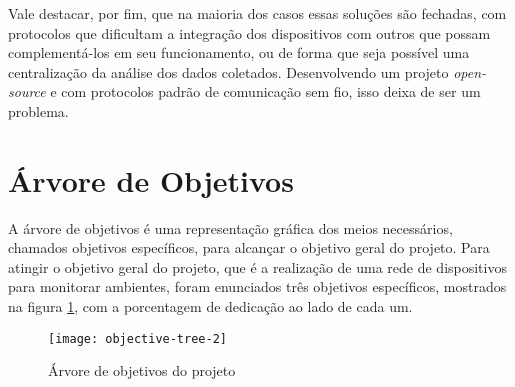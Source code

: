 \documentclass[../monografia.tex]{subfiles}
\begin{document}
Vale destacar, por fim, que na maioria dos casos essas soluções são fechadas, com protocolos que dificultam a integração dos dispositivos com outros que possam complementá-los em seu funcionamento, ou de forma que seja possível uma centralização da análise dos dados coletados. Desenvolvendo um projeto \textit{open-source} e com protocolos padrão de comunicação sem fio, isso deixa de ser um problema. 

\section{Árvore de Objetivos} 
A árvore de objetivos é uma representação gráfica dos meios necessários, chamados objetivos específicos, para alcançar o objetivo geral do projeto. Para atingir o objetivo geral do projeto, que é a realização de uma rede de dispositivos para monitorar ambientes, foram enunciados três objetivos específicos, mostrados na figura \ref{fig:objective-tree}, com a porcentagem de dedicação ao lado de cada um.

\begin{figure}[h!]
\texttt{[image: objective-tree-2]}
\centering
\caption{Árvore de objetivos do projeto}
\label{fig:objective-tree}
\end{figure}
\end{document}
